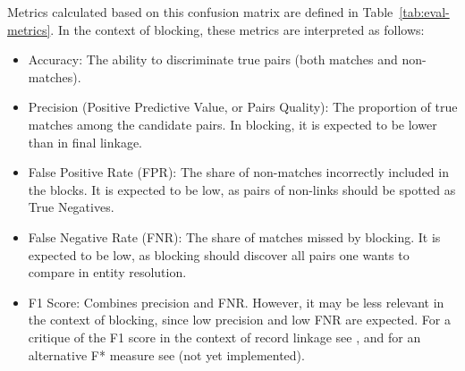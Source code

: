 Metrics calculated based on this confusion matrix are defined in Table~\ref{tab:eval-metrics}.
In the context of blocking, these metrics are interpreted as follows:

\begin{itemize}
\tightlist
\item
  Accuracy: The ability to discriminate true pairs (both matches and
  non-matches).
\item
  Precision (Positive Predictive Value, or Pairs Quality): The
  proportion of true matches among the candidate pairs. In blocking,
  it is expected to be lower than in final linkage.
\item
  False Positive Rate (FPR): The share of non-matches incorrectly
  included in the blocks. It is expected to be low, as pairs of
  non-links should be spotted as True Negatives.
\item
  False Negative Rate (FNR): The share of matches missed by blocking.
  It is expected to be low, as blocking should discover all pairs one
  wants to compare in entity resolution.
\item
  F1 Score: Combines precision and FNR. However, it may be less relevant in the context of blocking, since low precision and low FNR are expected. For a critique of the F1 score in the context of record linkage see \citet{hand2018}, and for an alternative F* measure see \citet{hand2021} (not yet implemented).
\end{itemize}

